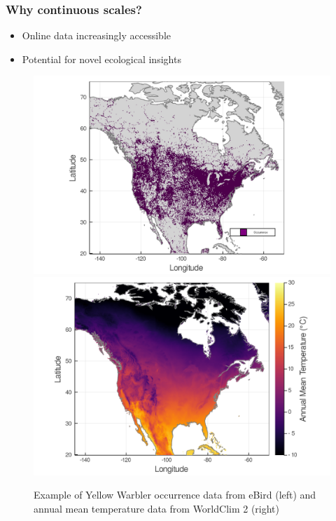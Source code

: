 \documentclass[10pt]{beamer}
\begin{document}
\begin{frame}
  \frametitle{Why continuous scales?}
  \begin{itemize}
    \item Online data increasingly accessible
    \item Potential for novel ecological insights
  \end{itemize}
  \begin{figure}
    \centering
    \hspace*{-1cm}\includegraphics[scale=0.10]{fig/01_raw_singlesp.png}%
    \includegraphics[scale=0.10]{fig/wc_temp.png}
    \caption{Example of Yellow Warbler occurrence data from eBird (left) and  annual mean temperature data from WorldClim 2 (right)}
  \end{figure}
\end{frame}
\end{document}

